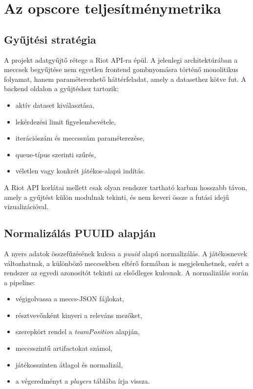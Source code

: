 \chapter{Az opscore teljesítménymetrika}

\section{Gyűjtési stratégia}

A projekt adatgyűjtő rétege a Riot API-ra épül. A jelenlegi architektúrában a meccsek begyűjtése nem egyetlen frontend gombnyomásra történő monolitikus folyamat, hanem paraméterezhető háttérfeladat, amely a datasethez kötve fut. A backend oldalon a gyűjtéshez tartozik:

\begin{itemize}
    \item aktív dataset kiválasztása,
    \item lekérdezési limit figyelembevétele,
    \item iterációszám és meccsszám paraméterezése,
    \item queue-típus szerinti szűrés,
    \item véletlen vagy konkrét játékos-alapú indítás.
\end{itemize}

A Riot API korlátai mellett csak olyan rendszer tartható karban hosszabb távon, amely a gyűjtést külön modulnak tekinti, és nem keveri össze a futási idejű vizualizációval.

\section{Normalizálás PUUID alapján}

A nyers adatok összefűzésének kulcsa a \textit{puuid} alapú normalizálás. A játékosnevek változhatnak, a különböző meccsekben eltérő formában is megjelenhetnek, ezért a rendszer az egyedi azonosítót tekinti az elsődleges kulcsnak. A normalizálás során a pipeline:

\begin{itemize}
    \item végigolvassa a meccs-JSON fájlokat,
    \item résztvevőnként kinyeri a releváns mezőket,
    \item szerepkört rendel a \textit{teamPosition} alapján,
    \item meccsszintű artifactokat számol,
    \item játékosszinten átlagol és normalizál,
    \item a végeredményt a \textit{players} táblába írja vissza.
\end{itemize}

